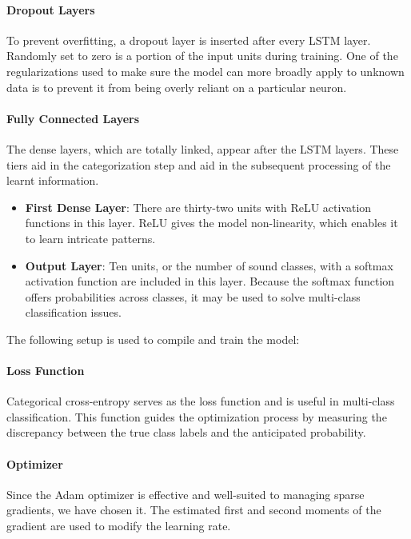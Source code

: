 \documentclass[conference]{IEEEtran}
\begin{document}
\paragraph{Dropout Layers}
To prevent overfitting, a dropout layer is inserted after every LSTM layer. Randomly set to zero is a portion of the input units during training. One of the regularizations used to make sure the model can more broadly apply to unknown data is to prevent it from being overly reliant on a particular neuron.


\paragraph{Fully Connected Layers}
The dense layers, which are totally linked, appear after the LSTM layers. These tiers aid in the categorization step and aid in the subsequent processing of the learnt information.

\begin{itemize}
    \item \textbf{First Dense Layer}: There are thirty-two units with ReLU activation functions in this layer. ReLU gives the model non-linearity, which enables it to learn intricate patterns.

    \item \textbf{Output Layer}: Ten units, or the number of sound classes, with a softmax activation function are included in this layer. Because the softmax function offers probabilities across classes, it may be used to solve multi-class classification issues.

\end{itemize}

The following setup is used to compile and train the model:


\paragraph{Loss Function}
Categorical cross-entropy serves as the loss function and is useful in multi-class classification. This function guides the optimization process by measuring the discrepancy between the true class labels and the anticipated probability.

\paragraph{Optimizer}
Since the Adam optimizer is effective and well-suited to managing sparse gradients, we have chosen it. The estimated first and second moments of the gradient are used to modify the learning rate.
\end{document}
